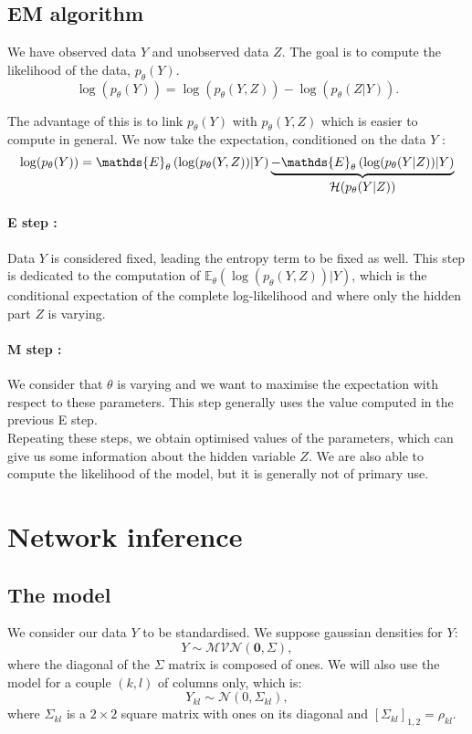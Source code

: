 \documentclass[a4paper,11pt]{article}
\begin{document}
  \subsection{EM algorithm}

We have observed data $Y$ and unobserved data $Z$. The goal is to compute the likelihood of the data, $p_\theta (Y)$.
\[ \log(p_\theta (Y)) = \log (p_\theta (Y,Z)) - \log(p_\theta (Z|Y)).\]

The advantage of this is to link $p_\theta(Y)$ with $p_\theta (Y,Z)$ which is easier to compute in general. We now take the expectation,
conditioned on the data $Y$ :
\[ \log(p_\theta (Y) )= \mathds{E}_\theta \left(\log(p_\theta (Y,Z))|Y \right) \underbrace{- \mathds{E}_\theta \left(\log(p_\theta (Y|Z))|Y \right)}_{\text{\normalsize{$\mathcal{H}(p_\theta (Y|Z))$}}} \]

\paragraph{E step :}
Data $Y$ is considered fixed, leading the entropy term to be fixed as well. This step is dedicated to the computation of 
$\mathds{E}_\theta \left(\log(p_\theta (Y,Z))|Y \right)$, which is the conditional expectation of the complete log-likelihood and 
where only the hidden part $Z$ is varying. \\

\paragraph{M step :}
We consider that  $\theta$ is varying and we want to maximise the expectation with respect to these parameters. This step generally uses 
the value computed in the previous E step.\\

Repeating these steps, we obtain optimised values of the parameters, which can give us some information about the hidden variable $Z$. 
We are also able to compute the likelihood of the model, but it is generally not of primary use.

\section{Network inference}
  \subsection{The model}
  We consider our data $Y$ to be standardised. We suppose gaussian densities for $Y$:
  \[Y \sim \mathcal{MVN}(\mathbf{0},\Sigma),\]
  where the diagonal of the $\Sigma$ matrix is composed of ones. We will also use the model for a couple $(k,l)$ of columns only, which is:
  \[Y_{kl}\sim\mathcal{N}(0,\Sigma_{kl}),\]
  where $ \Sigma_{kl}$ is a $2\times 2$ square matrix with ones on its diagonal and $[\Sigma_{kl}]_{1,2} = \rho_{kl}$.\\
  
\end{document}

